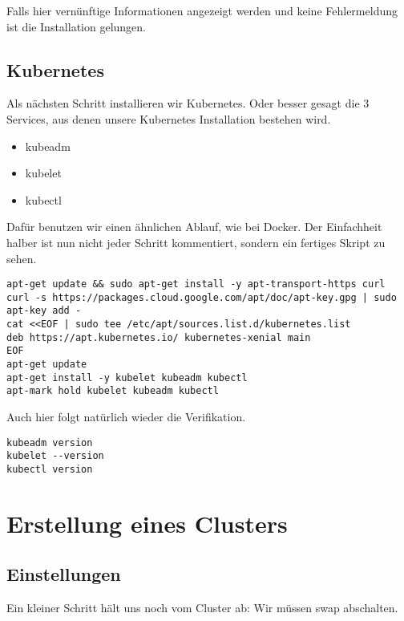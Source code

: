 Falls hier vernünftige Informationen angezeigt werden und keine
Fehlermeldung ist die Installation gelungen.

\hypertarget{kubernetes-1}{%
\subsection{Kubernetes}\label{kubernetes-1}}

Als nächsten Schritt installieren wir Kubernetes. Oder besser gesagt die
3 Services, aus denen unsere Kubernetes Installation bestehen wird.

\begin{itemize}
\tightlist
\item
  kubeadm
\item
  kubelet
\item
  kubectl
\end{itemize}

Dafür benutzen wir einen ähnlichen Ablauf, wie bei Docker. Der
Einfachheit halber ist nun nicht jeder Schritt kommentiert, sondern ein
fertiges Skript zu sehen.

\begin{lstlisting}
apt-get update && sudo apt-get install -y apt-transport-https curl
curl -s https://packages.cloud.google.com/apt/doc/apt-key.gpg | sudo apt-key add -
cat <<EOF | sudo tee /etc/apt/sources.list.d/kubernetes.list
deb https://apt.kubernetes.io/ kubernetes-xenial main
EOF
apt-get update
apt-get install -y kubelet kubeadm kubectl
apt-mark hold kubelet kubeadm kubectl
\end{lstlisting}

Auch hier folgt natürlich wieder die Verifikation.

\begin{lstlisting}
kubeadm version
kubelet --version
kubectl version
\end{lstlisting}

\hypertarget{erstellung-eines-clusters}{%
\section{Erstellung eines Clusters}\label{erstellung-eines-clusters}}

\hypertarget{einstellungen}{%
\subsection{Einstellungen}\label{einstellungen}}

Ein kleiner Schritt hält uns noch vom Cluster ab: Wir müssen swap
abschalten.

